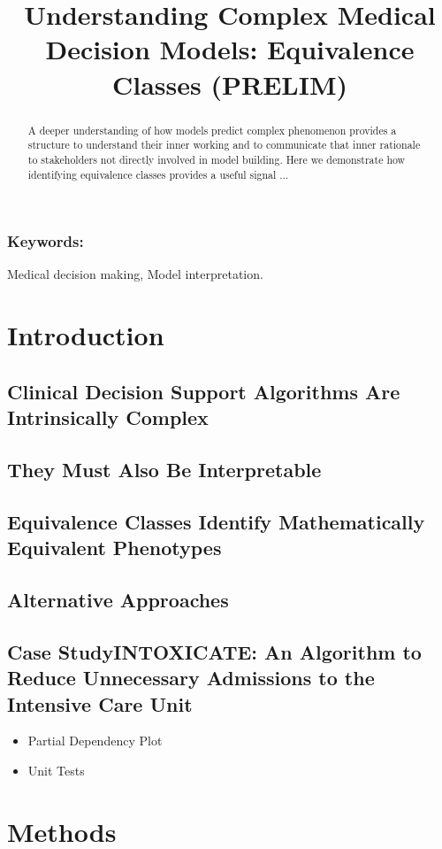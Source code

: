 \documentclass[10pt]{article}
\title{Understanding Complex Medical Decision Models: Equivalence Classes (PRELIM)}
\date{}
\begin{document}
\maketitle
\begin{abstract}
A deeper understanding of how models predict complex phenomenon provides a structure to understand their inner working and to communicate that inner rationale to stakeholders not directly involved in model building. Here we demonstrate how identifying equivalence classes provides a useful signal $\ldots$
\end{abstract}

\subsubsection*{Keywords:}
Medical decision making, Model interpretation. 

\section{Introduction}\label{sec:intro}

\subsection{Clinical Decision Support Algorithms Are Intrinsically Complex}
\subsection{They Must Also Be Interpretable}
\subsection{Equivalence Classes Identify Mathematically Equivalent Phenotypes}
\subsection{Alternative Approaches}
\subsection{Case Study\textemdash INTOXICATE: An Algorithm to Reduce Unnecessary Admissions to the Intensive Care Unit}
\begin{itemize}
  \item Partial Dependency Plot
  \item Unit Tests
\end{itemize}

\section{Methods}
\end{document}
